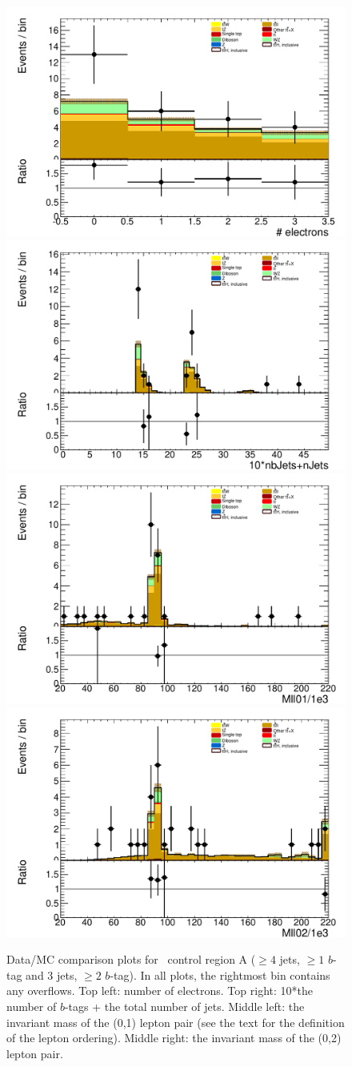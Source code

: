 \begin{figure}
 \begin{center}
\includegraphics[width=.5\linewidth]{figs/ttZ/ttz_3l_CR_nelec}%
\includegraphics[width=.5\linewidth]{figs/ttZ/ttz_3l_CR_nJets_and_nbJets_lin}\\
\includegraphics[width=.5\linewidth]{figs/ttZ/ttz_3l_CR_Mll01}%
\includegraphics[width=.5\linewidth]{figs/ttZ/ttz_3l_CR_Mll02}\\
  \caption{\label{figure:background_ttZCRA}Data/MC comparison plots for \ttZ\ control region A ($\ge4$ jets, $\ge1$ $b$-tag and 3 jets, $\ge 2$ $b$-tag). In all plots, the rightmost bin contains any overflows.  Top left: number of electrons.  Top right: 10*the number of $b$-tags + the total number of jets. Middle left: the invariant mass of the (0,1) lepton pair (see the text for the definition of the lepton ordering).  Middle right: the invariant mass of the (0,2) lepton pair.}
 \end{center}
\end{figure}



